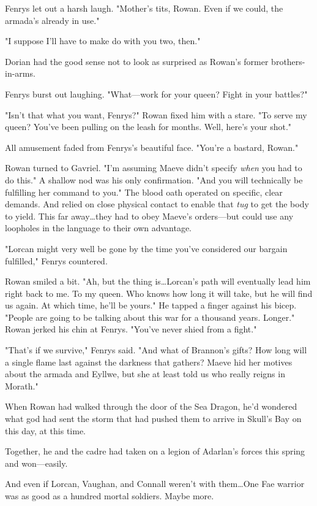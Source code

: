 Fenrys let out a harsh laugh.
"Mother's tits, Rowan.
Even if we could, the armada's already in use."

"I suppose I'll have to make do with you two, then."

Dorian had the good sense not to look as surprised as Rowan's former brothers-in-arms.

Fenrys burst out laughing.
"What---work for your queen?
Fight in your battles?"

"Isn't that what you want, Fenrys?"
Rowan fixed him with a stare.
"To serve my queen?
You've been pulling on the leash for months.
Well, here's your shot."

All amusement faded from Fenrys's beautiful face.
"You're a bastard, Rowan."

Rowan turned to Gavriel.
"I'm assuming Maeve didn't specify \emph{when}
you had to do this."
A shallow nod was his only confirmation.
"And you will technically be fulfilling her command to you."
The blood oath operated on specific, clear demands.
And relied on close physical contact to enable that \emph{tug} to get the body to yield.
This far away\ldots they had to obey Maeve's orders---but could use any loopholes in the language to their own advantage.

"Lorcan might very well be gone by the time you've considered our bargain fulfilled," Fenrys countered.

Rowan smiled a bit.
"Ah, but the thing is\ldots Lorcan's path will eventually lead him right back to me.
To my queen.
Who knows how long it will take, but he will find us again.
At which time, he'll be yours."
He tapped a finger against his bicep.
"People are going to be talking about this war for a thousand years.
Longer."
Rowan jerked his chin at Fenrys.
"You've never shied from a fight."

"That's if we survive," Fenrys said.
"And what of Brannon's gifts?
How long will a single flame last against the darkness that gathers?
Maeve hid her motives about the armada and Eyllwe, but she at least told us who really reigns in Morath."

When Rowan had walked through the door of the Sea Dragon, he'd wondered what god had sent the storm that had pushed them to arrive in Skull's Bay on this day, at this time.

Together, he and the cadre had taken on a legion of Adarlan's forces this spring and won---easily.

And even if Lorcan, Vaughan, and Connall weren't with them\ldots One Fae warrior was as good as a hundred mortal soldiers.
Maybe more.

